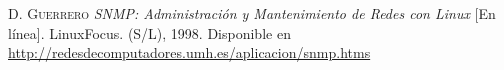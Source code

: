 
\begin{thebibliography}{X}

		\textsc{D. Guerrero}
		\textit{SNMP: Administración y Mantenimiento de Redes con Linux} [En línea].
		LinuxFocus. (S/L), 1998. 
		\newline
		Disponible en 
		\url{http://redesdecomputadores.umh.es/aplicacion/snmp.htms}

\end{thebibliography}

